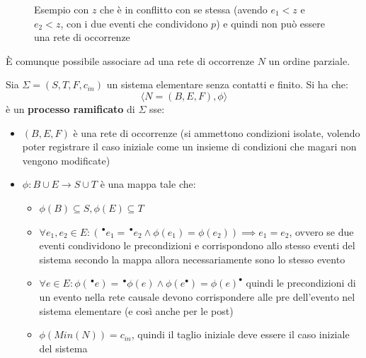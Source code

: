 \documentclass[a4paper,12pt, oneside]{book}
\begin{document}
\begin{definizione}
\begin{itemize}
\begin{figure}[H]
      \caption{Esempio con $z$ che è in conflitto con se stessa (avendo $e_1<z$
        e $e_2<z$, con i due eventi che condividono $p$) e quindi non può
        essere una rete di occorrenze}
    \end{figure}
  \end{itemize}
  È comunque possibile associare ad una rete di occorrenze $N$ un ordine
  parziale. 
\end{definizione}

\begin{definizione}
  Sia $\Sigma=(S,T,F,c_{in})$ un sistema elementare senza contatti e
  finito. Si ha che:
  \[\langle N=(B,E,F), \phi\rangle\]
  è un \textbf{processo ramificato} di $\Sigma$ sse:
  \begin{itemize}
    \item $(B,E,F)$ è una rete di occorrenze (si ammettono condizioni isolate,
    volendo poter registrare il caso iniziale come un insieme di condizioni che
    magari non vengono modificate)
    \item $\phi:B\cup E\to S\cup T$ è una mappa tale che:
    \begin{itemize}
      \item $\phi(B)\subseteq S, \phi(E)\subseteq T$
      \item $\forall e_1,e_2\in E:(\,^\bullet e_1=\,^\bullet e_2\land
      \phi(e_1)=\phi(e_2))\implies e_1=e_2$, ovvero se due eventi condividono le
      precondizioni e corrispondono allo stesso eventi del sistema secondo la
      mappa allora necessariamente sono lo stesso evento
      \item $\forall e\in E:\phi(\,^\bullet e)=\,^\bullet
      \phi(e)\land\phi(e^\bullet)=\phi(e)^\bullet$ quindi le precondizioni di un
      evento nella rete causale devono corrispondere alle pre dell'evento nel
      sistema elementare (e così anche per le post)
      \item $\phi(Min(N))=c_{in}$, quindi il taglio iniziale deve essere il caso
      iniziale del sistema
    \end{itemize}
  \end{itemize}
\end{definizione}
\end{document}
